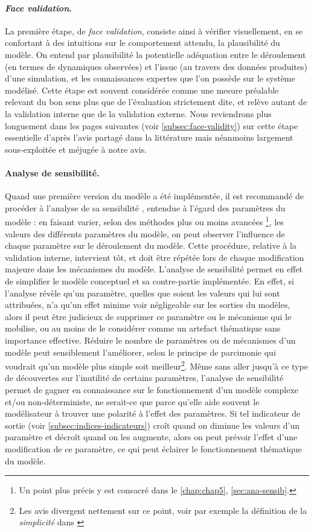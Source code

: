 \paragraph{\og \textit{Face validation}\fg{}.}
La première étape, de \og \textit{face validation}\fg{}, consiste ainsi à vérifier visuellement, en se confortant à des intuitions sur le comportement attendu, la plausibilité du modèle.
On entend par plausibilité la potentielle adéquation entre le déroulement (en termes de dynamiques observées) et l'issue (au travers des données produites) d'une simulation, et les connaissances expertes que l'on possède sur le système modélisé.
Cette étape est souvent considérée comme une mesure préalable relevant du bon sens plus que de l'évaluation strictement dite, et relève autant de la validation interne que de la validation externe.
Nous reviendrons plus longuement dans les pages suivantes (voir \cref{subsec:face-validity}) sur cette étape essentielle d'après l'avis partagé dans la littérature mais néanmoins largement sous-exploitée et méjugée à notre avis.

\paragraph{Analyse de sensibilité.}
Quand une première version du modèle a été implémentée, il est recommandé de procéder à l'analyse de sa \og sensibilité \fg{}, entendue à l'égard des paramètres du modèle : en faisant varier, selon des méthodes plus ou moins avancées
\footnote{
	Un point plus précis y est consacré dans le \cref{chap:chap5}, \cref{sec:ana-sensib}.
}, les valeurs des différents paramètres du modèle, on peut observer l'influence de chaque paramètre sur le déroulement du modèle.
Cette procédure, relative à la validation interne, intervient tôt, et doit être répétée lors de chaque modification majeure dans les mécanismes du modèle.
L'analyse de sensibilité permet en effet de simplifier le modèle conceptuel et sa contre-partie implémentée.
En effet, si l'analyse révèle qu'un paramètre, quelles que soient les valeurs qui lui sont attribuées, n'a qu'un effet minime voir négligeable sur les sorties du modèles, alors il peut être judicieux de supprimer ce paramètre ou le mécanisme qui le mobilise, ou au moins de le considérer comme un artefact thématique sans importance effective.
Réduire le nombre de paramètres ou de mécanismes d'un modèle peut sensiblement l'améliorer, selon le principe de parcimonie qui voudrait qu'un modèle plus simple soit meilleur\footnote{
	Les avis divergent nettement sur ce point, voir par exemple la définition de la \textit{simplicité} dans \textcite[120]{amblard_evaluation_2006}
}.
Même sans aller jusqu'à ce type de découvertes sur l'inutilité de certains paramètres, l'analyse de sensibilité permet de gagner en connaissance sur le fonctionnement d'un modèle complexe et/ou non-déterministe, ne serait-ce que parce qu'elle aide souvent le modélisateur à trouver une \og polarité \fg{} à l'effet des paramètres.
Si tel indicateur de sortie (voir \cref{subsec:indices-indicateurs}) croît quand on diminue les valeurs d'un paramètre et décroît quand on les augmente, alors on peut prévoir l'effet d'une modification de ce paramètre, ce qui peut éclairer le fonctionnement thématique du modèle.

